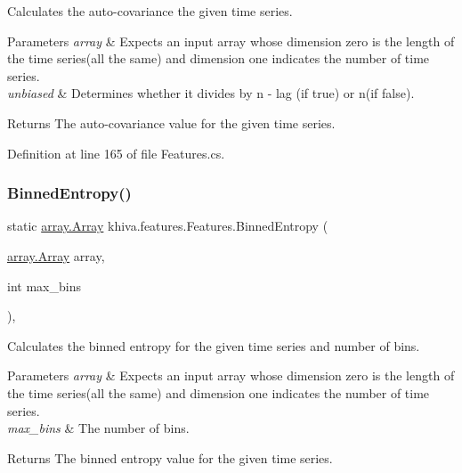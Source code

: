 Calculates the auto-\/covariance the given time series. 


\begin{DoxyParams}{Parameters}
{\em array} & Expects an input array whose dimension zero is the length of the time series(all the same) and dimension one indicates the number of time series.\\
\hline
{\em unbiased} & Determines whether it divides by n -\/ lag (if true) or n(if false).\\
\hline
\end{DoxyParams}
\begin{DoxyReturn}{Returns}
The auto-\/covariance value for the given time series.
\end{DoxyReturn}


Definition at line 165 of file Features.\+cs.

\mbox{\label{classkhiva_1_1features_1_1_features_a31971d8e1841648005522eb08a7120c8}} 
\subsubsection{\texorpdfstring{Binned\+Entropy()}{BinnedEntropy()}}
{\footnotesize\ttfamily static \mbox{\hyperlink{classkhiva_1_1array_1_1_array}{array.\+Array}} khiva.\+features.\+Features.\+Binned\+Entropy (\begin{DoxyParamCaption}\item[{\mbox{\hyperlink{classkhiva_1_1array_1_1_array}{array.\+Array}}}]{array,  }\item[{int}]{max\+\_\+bins }\end{DoxyParamCaption})\hspace{0.3cm}{\ttfamily [inline]}, {\ttfamily [static]}}



Calculates the binned entropy for the given time series and number of bins. 


\begin{DoxyParams}{Parameters}
{\em array} & Expects an input array whose dimension zero is the length of the time series(all the same) and dimension one indicates the number of time series.\\
\hline
{\em max\+\_\+bins} & The number of bins.\\
\hline
\end{DoxyParams}
\begin{DoxyReturn}{Returns}
The binned entropy value for the given time series.
\end{DoxyReturn}



